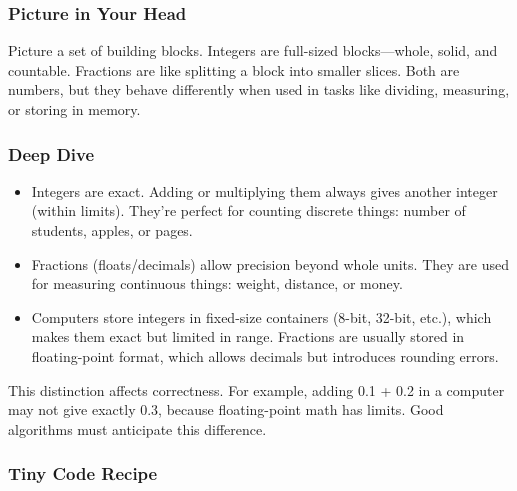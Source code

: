 \documentclass[
  letterpaper,
  DIV=11,
  numbers=noendperiod]{scrreprt}
\providecommand{\tightlist}{%
  \setlength{\itemsep}{0pt}\setlength{\parskip}{0pt}}
\begin{document}
\subsubsection{Picture in Your Head}\label{picture-in-your-head-50}

Picture a set of building blocks. Integers are full-sized
blocks---whole, solid, and countable. Fractions are like splitting a
block into smaller slices. Both are numbers, but they behave differently
when used in tasks like dividing, measuring, or storing in memory.

\subsubsection{Deep Dive}\label{deep-dive-20}

\begin{itemize}
\tightlist
\item
  Integers are exact. Adding or multiplying them always gives another
  integer (within limits). They're perfect for counting discrete things:
  number of students, apples, or pages.
\item
  Fractions (floats/decimals) allow precision beyond whole units. They
  are used for measuring continuous things: weight, distance, or money.
\item
  Computers store integers in fixed-size containers (8-bit, 32-bit,
  etc.), which makes them exact but limited in range. Fractions are
  usually stored in floating-point format, which allows decimals but
  introduces rounding errors.
\end{itemize}

This distinction affects correctness. For example, adding 0.1 + 0.2 in a
computer may not give exactly 0.3, because floating-point math has
limits. Good algorithms must anticipate this difference.

\subsubsection{Tiny Code Recipe}\label{tiny-code-recipe-48}
\end{document}
